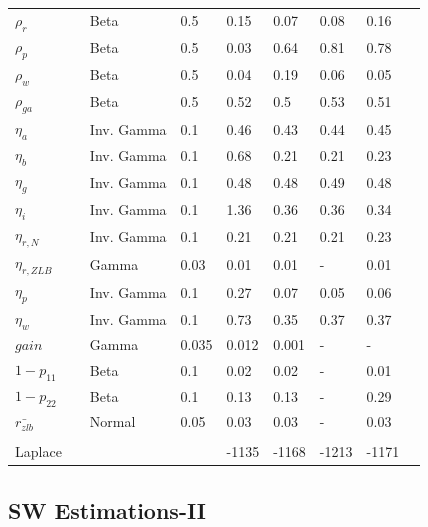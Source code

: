\documentclass[12pt,reqno]{article}
\numberwithin{equation}{section}
\begin{document}
\begin{table}[H]
\begin{tabular}{llll|ll|lll}
$\rho_r$ &  & Beta & 0.5 			& 0.15 & 0.07 & 0.08 & 0.16 \\
$\rho_p$ &  & Beta & 0.5 			& 0.03 & 0.64 & 0.81 & 0.78 \\
$\rho_w$ &  & Beta & 0.5 			& 0.04 & 0.19 & 0.06 & 0.05 \\
$\rho_{ga}$ &  & Beta & 0.5 		& 0.52 & 0.5 & 0.53 & 0.51 \\
$\eta_a$ &  & Inv. Gamma & 0.1 		& 0.46 & 0.43 & 0.44 & 0.45 \\
$\eta_b$ &  & Inv. Gamma & 0.1 		& 0.68 & 0.21 & 0.21 & 0.23 \\
$\eta_g$ &  & Inv. Gamma & 0.1 		& 0.48 & 0.48 & 0.49 & 0.48 \\
$\eta_i$ &  & Inv. Gamma & 0.1 		& 1.36 & 0.36 & 0.36 & 0.34 \\
$\eta_{r,N}$ &  & Inv. Gamma & 0.1 	& 0.21 & 0.21 & 0.21 & 0.23 \\
$\eta_{r,ZLB}$ &  & Gamma & 0.03 	& 0.01 & 0.01 & - & 0.01 \\
$\eta_p$ &  & Inv. Gamma & 0.1 		& 0.27 & 0.07 & 0.05 & 0.06 \\
$\eta_w$ &  & Inv. Gamma & 0.1 		& 0.73 & 0.35 & 0.37 & 0.37 \\
$gain$ &  & Gamma & 0.035 			& 0.012 & 0.001 & - &  -\\
$1-p_{11}$ &  & Beta & 0.1 			& 0.02 & 0.02 & - & 0.01 \\
$1-p_{22}$ &  & Beta & 0.1 			& 0.13 & 0.13 & - & 0.29 \\
$\bar{r_{zlb}}$ &  & Normal & 0.05 	& 0.03 & 0.03 & - & 0.03 \\
 &  &  &  &  &  &  &  \\
Laplace &  &  &  & -1135 & -1168 & -1213 & -1171
\end{tabular}
\end{table}


\subsection*{SW Estimations-II}
\end{document}
